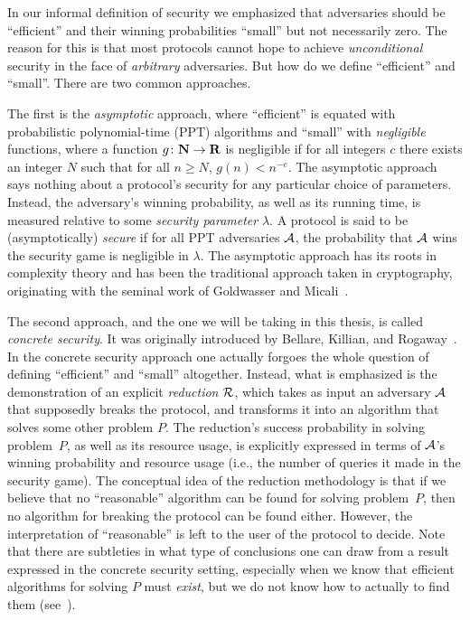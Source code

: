 In our informal definition of security we emphasized that adversaries should be  ``efficient'' and their winning probabilities  ``small'' but not necessarily zero. 
The reason for this is that most protocols cannot hope to achieve \emph{unconditional} security in the face of \emph{arbitrary} adversaries.
But how do we define ``efficient'' and ``small''.
There are two common approaches.

The first is the \emph{asymptotic} approach,
where ``efficient'' is equated with probabilistic polynomial-time (PPT) algorithms and ``small'' with \emph{negligible} functions,
where a function $g \colon \N \to \R$ is negligible if for all integers $c$ there exists an integer $N$ such that for all $n \geq N$,
$g(n) < n^{-c}$. 
The asymptotic approach says nothing about a protocol's security for any particular choice of parameters.
Instead,
the adversary's winning probability,
as well as its running time,
is measured relative to some \emph{security parameter} $\lambda$.
A protocol is said to be (asymptotically) \emph{secure} if for all PPT adversaries $\A$,
the probability that $\A$ wins the security game is negligible in $\lambda$. 
%
The asymptotic approach has its roots in complexity theory and has been the traditional approach taken in cryptography,
originating with the seminal work of Goldwasser and Micali~\cite{GoldwasserM:1984:probabilistic_encryption}.


The second approach,
and the one we will be taking in this thesis,
is called \emph{concrete security}.
It was originally introduced by Bellare, Killian, and Rogaway~\cite{C:BelKilRog94}.
In the concrete security approach one actually forgoes the whole question of defining ``efficient'' and ``small'' altogether. 
Instead,
what is emphasized is the demonstration of an explicit \emph{reduction} $\A[R]$,
which takes as input an adversary $\A$ that supposedly breaks the protocol,
and transforms it into an algorithm that solves some other problem $P$.
The reduction's success probability in solving problem~$P$,
as well as its resource usage,
is explicitly expressed in terms of $\A$'s winning probability and resource usage
(i.e.,
the number of queries it made in the security game).
The conceptual idea of the reduction methodology is that if we believe that no ``reasonable'' algorithm can be found for solving problem~$P$,
then no algorithm for breaking the protocol can be found either.
However,
the interpretation of ``reasonable'' is left  to the user of the protocol to decide.
Note that there are subtleties in what type of conclusions one can draw from a result expressed in the concrete security setting,
especially when we know that efficient algorithms for solving $P$ must \emph{exist},
but we do not know how to actually to find them
(see~\cite{VIETCRYPT:Rogaway06,AC:BerLan13}).
 


